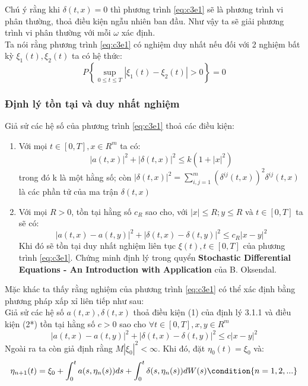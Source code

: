 \documentclass[a4paper]{article}
\numberwithin{equation}{section}
\begin{document}
Chú ý rằng khi $\delta(t,x)=0$ thì phương trình \eqref{eq:c3e1} sẽ là phương trình vi phân thường, thoả điều kiện ngẫu nhiên ban đầu. Như vậy ta sẽ giải phương trình vi phân thường với mỗi $\omega$ xác định.\\
Ta nói rằng phương trình \eqref{eq:c3e1} có nghiệm duy nhất nếu đối với 2 nghiệm bất kỳ $\xi_1(t),\xi_2(t)$ ta có hệ thức:\\
\begin{equation*}
	P\left\{\sup_{0\leq t\leq T}|\xi_1(t)-\xi_2(t)|>0 \right\}=0
\end{equation*}
\subsubsection{Định lý tồn tại và duy nhất nghiệm}
Giả sử các hệ số của phương trình \eqref{eq:c3e1} thoả các điều kiện:
\begin{enumerate}[(1)]
	\item Với mọi $t\in[0,T],x\in R^m$ ta có:
\begin{equation*}
	|a(t,x)|^2+|\delta(t,x)|^2\leq k(1+|x|^2)
\end{equation*}
trong đó k là một hằng số; còn $|\delta(t,x)|^2=\sum\limits_{i,j=1}^m(\delta^{ij}(t,x))^2\delta^{ij}(t,x)$ là các phần tử của ma trận $\delta(t,x)$
	\item Với mọi $R>0$, tồn tại hằng số $c_R$ sao cho, với $|x|\leq R;y\leq R$ và $t\in[0,T]$ ta sẽ có:
\begin{equation*}
	|a(t,x)-a(t,y)|^2+|\delta(t,x)-\delta(t,y)|^2\leq c_R|x-y|^2
\end{equation*}
Khi đó sẽ tồn tại duy nhất nghiệm liên tục $\xi(t),t\in[0,T]$ của phương trình \eqref{eq:c3e1}. Chứng minh định lý trong quyển \textbf{Stochastic Differential Equations - An Introduction with Application} của B. Oksendal.
\end{enumerate}
Mặc khác ta thấy rằng nghiệm của phương trình \eqref{eq:c3e1} có thể xác định bằng phương pháp xấp xỉ liên tiếp như sau:\\
Giả sử các hệ số $a(t,x),\delta(t,x)$ thoả điều kiện (1) của định lý 3.1.1 và điều kiện (2*) tồn tại hằng số $c>0$ sao cho $\forall t\in[0,T],x,y\in R^m$
\begin{equation*}
	|a(t,x)-a(t,y)|^2+|\delta(t,x)-\delta(t,y)|^2\leq c|x-y|^2
\end{equation*}
Ngoài ra ta còn giả định rằng $M|\xi_0|^2<\infty$. Khi đó, đặt $\eta_0(t)=\xi_0$ và:
\begin{equation*}
	\eta_{n+1}(t)=\xi_0+\int_{0}^ta(s,\eta_n(s))ds+\int_0^t\delta(s,\eta_n(s))dW(s) \condition{n=1,2,...}
\end{equation*}
\end{document}
